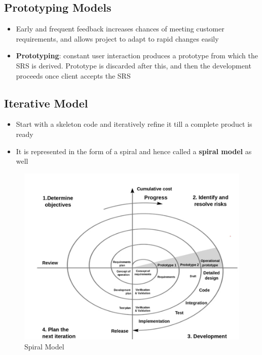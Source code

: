 \documentclass{article}
\begin{document}
\subsection{Prototyping Models}
\begin{itemize}
    \item Early and frequent feedback increases chances of meeting customer requirements, and allows project to adapt to rapid changes easily
    
    \item \textbf{Prototyping}: constant user interaction produces a prototype from which the SRS is derived. Prototype is discarded after this, and then the development proceeds once client accepts the SRS
\end{itemize}

\subsection{Iterative Model}
\begin{itemize}
    \item Start with a skeleton code and iteratively refine it till a complete product is ready
    
    \item It is represented in the form of a spiral and hence called a \textbf{spiral model} as well
\end{itemize}

\begin{figure}[!ht]
    \centering
    \includegraphics[scale=0.5]{p1.png}
    \caption{Spiral Model}
    \label{fig:my_label}
\end{figure}
\end{document}

